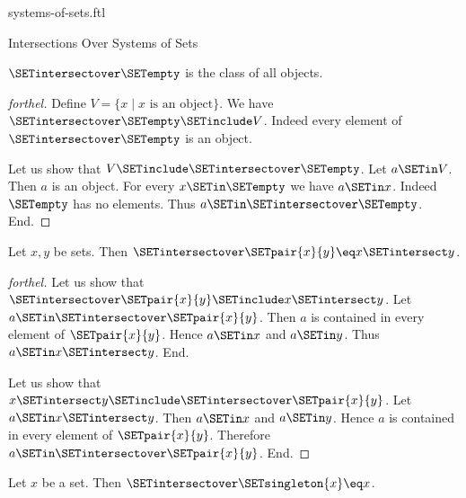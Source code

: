 \documentclass{naproche-library}
\begin{document}
\begin{smodule}[title=Systems of Sets]{systems-of-sets.ftl}
\begin{sfragment}{Intersections Over Systems of Sets}
  \begin{proposition}[forthel,id=FOUNDATIONS_10_2809770322952192]
    $\SETintersectover \SETempty$ is the class of all objects.
  \end{proposition}
  \begin{proof}[forthel]
    Define $V = \{ x \mid x\text{ is an object}\}$.
    We have $\SETintersectover \SETempty \SETinclude V$.
    Indeed every element of $\SETintersectover \SETempty$ is an object.

    Let us show that $V \SETinclude \SETintersectover \SETempty$.
      Let $a \SETin V$.
      Then $a$ is an object.
      For every $x \SETin \SETempty$ we have $a \SETin x$.
      Indeed $\SETempty$ has no elements.
      Thus $a \SETin \SETintersectover \SETempty$.
    End.
  \end{proof}

  \begin{proposition}[forthel,id=FOUNDATIONS_10_7851827447988224]
    Let $x, y$ be sets.
    Then $\SETintersectover \SETpair{x}{y} \eq x \SETintersect y$.
  \end{proposition}
  \begin{proof}[forthel]
    Let us show that $\SETintersectover \SETpair{x}{y} \SETinclude x \SETintersect y$.
      Let $a \SETin \SETintersectover \SETpair{x}{y}$.
      Then $a$ is contained in every element of $\SETpair{x}{y}$.
      Hence $a \SETin x$ and $a \SETin y$.
      Thus $a \SETin x \SETintersect y$.
    End.

    Let us show that $x \SETintersect y \SETinclude \SETintersectover \SETpair{x}{y}$.
      Let $a \SETin x \SETintersect y$.
      Then $a \SETin x$ and $a \SETin y$.
      Hence $a$ is contained in every element of $\SETpair{x}{y}$.
      Therefore $a \SETin \SETintersectover \SETpair{x}{y}$.
    End.
  \end{proof}

  \begin{corollary}[forthel,id=FOUNDATIONS_10_7239895674257408]
    Let $x$ be a set.
    Then $\SETintersectover \SETsingleton{x} \eq x$.
  \end{corollary}
\end{sfragment}
\end{smodule}
\end{document}

